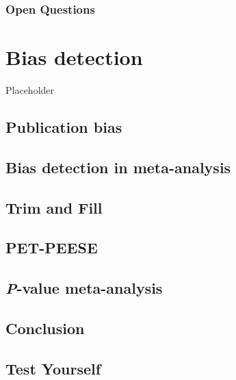 \documentclass[
  oneside]{krantz}
\begin{document}
\hypertarget{open-questions-9}{%
\subsubsection{Open Questions}\label{open-questions-9}}

\hypertarget{bias}{%
\section{Bias detection}\label{bias}}

Placeholder

\hypertarget{publicationbias}{%
\subsection{Publication bias}\label{publicationbias}}

\hypertarget{bias-detection-in-meta-analysis}{%
\subsection{Bias detection in
meta-analysis}\label{bias-detection-in-meta-analysis}}

\hypertarget{trim-and-fill}{%
\subsection{Trim and Fill}\label{trim-and-fill}}

\hypertarget{pet-peese}{%
\subsection{PET-PEESE}\label{pet-peese}}

\hypertarget{p-value-meta-analysis}{%
\subsection{\texorpdfstring{\emph{P}-value
meta-analysis}{P-value meta-analysis}}\label{p-value-meta-analysis}}

\hypertarget{conclusion}{%
\subsection{Conclusion}\label{conclusion}}

\hypertarget{test-yourself-10}{%
\subsection{Test Yourself}\label{test-yourself-10}}
\end{document}

